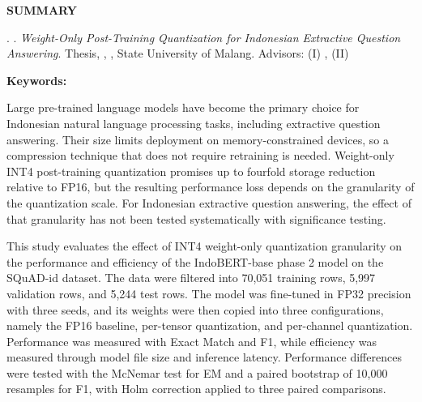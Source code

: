 %
%

\clearpage
{}

\begin{center}
    \bfseries SUMMARY
\end{center}

\begin{singlespace}

\noindent \penulis. \bulantahun. \textit{Weight-Only Post-Training Quantization for Indonesian Extractive Question Answering}. Thesis, \departemen, \fakultas, State University of Malang. Advisors: (I) \pembimbingSatu\ifx\pembimbingDua\empty\else, (II) \pembimbingDua\fi

\vspace{0.5\baselineskip}
\noindent \textbf{Keywords:} \katakunciEn%

\vspace{\baselineskip}

Large pre-trained language models have become the primary choice for Indonesian natural language processing tasks, including extractive question answering. Their size limits deployment on memory-constrained devices, so a compression technique that does not require retraining is needed. Weight-only INT4 post-training quantization promises up to fourfold storage reduction relative to FP16, but the resulting performance loss depends on the granularity of the quantization scale. For Indonesian extractive question answering, the effect of that granularity has not been tested systematically with significance testing.

This study evaluates the effect of INT4 weight-only quantization granularity on the performance and efficiency of the IndoBERT-base phase 2 model on the SQuAD-id dataset. The data were filtered into 70,051 training rows, 5,997 validation rows, and 5,244 test rows. The model was fine-tuned in FP32 precision with three seeds, and its weights were then copied into three configurations, namely the FP16 baseline, per-tensor quantization, and per-channel quantization. Performance was measured with Exact Match and F1, while efficiency was measured through model file size and inference latency. Performance differences were tested with the McNemar test for EM and a paired bootstrap of 10,000 resamples for F1, with Holm correction applied to three paired comparisons.


\end{singlespace}
